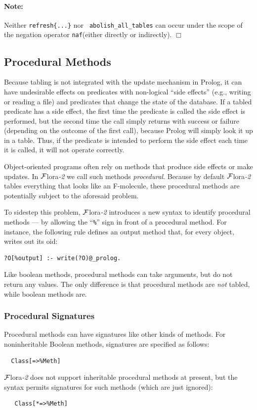 \documentclass[11pt]{article}
\newcommand{\FLORA}{{\mbox{\sc ${\cal F}${lora}\rm\emph{-2}}}\xspace}
\newcommand{\RULELOGNAF}{{{\tt naf}}\xspace}
\begin{document}
\paragraph{Note:} Neither {\tt refresh\{...\}} nor {\tt
  abolish\_all\_tables} can occur under the scope of the
negation operator  \RULELOGNAF (either directly or indirectly).
\hfill $\Box$


\subsection{Procedural Methods}\label{sec-proc-methods}

%
Because tabling is not integrated with the update mechanism in Prolog, it can
have undesirable effects on predicates with non-logical ``side effects''
(e.g., writing or reading a file) and predicates that change the state of
the database.  If a tabled predicate has a side effect, the first time the
predicate is called the side effect is performed, but the second time the
call simply returns with success or failure (depending on the outcome of
the first call), because Prolog will simply look it up in a table.  Thus, if
the predicate is intended to perform the side effect each time it is
called, it will not operate correctly.

Object-oriented programs often rely on methods that produce side effects
or make updates.  In \FLORA we call such methods \emph{procedural}.
Because by default \FLORA tables everything that looks like an F-molecule,
these procedural methods are potentially subject to the aforesaid problem.

To sidestep this problem, \FLORA introduces a new syntax to identify
procedural methods --- by allowing the ``\verb|%|'' sign in front of a
procedural method. For instance, the following rule defines an output
method that, for every object, writes out its oid:
\begin{verbatim}
?O[%output] :- write(?O)@_prolog.
\end{verbatim}
Like boolean methods, procedural methods can take arguments, but do not
return any values.  The only difference is that procedural methods are
\emph{not} tabled, while boolean methods are.

\subsubsection{Procedural Signatures}

Procedural methods can have signatures like other kinds of methods.
For noninheritable Boolean methods, signatures are specified as follows:
\begin{verbatim}
  Class[=>%Meth]
\end{verbatim}
\FLORA does not support inheritable procedural methods at present, but the
syntax permits signatures for such methods (which are just ignored):
\begin{verbatim}
   Class[*=>%Meth]
\end{verbatim}
\end{document}
